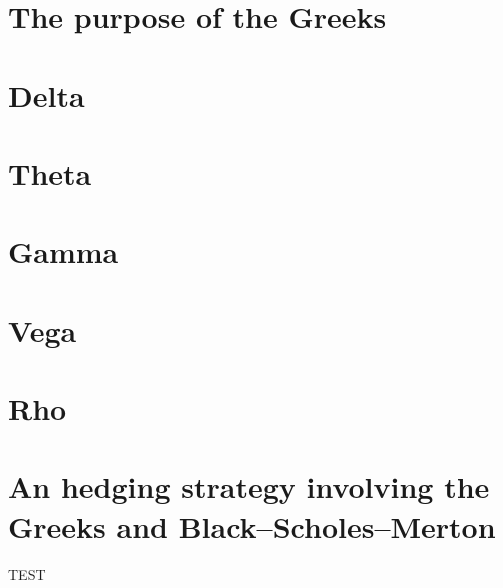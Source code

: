\documentclass[12pt]{report}
\newcommand{\BSM}{Black--Scholes--Merton }
\begin{document}
\section{The purpose of the Greeks}
\label{sec:The purpose of the Greeks}


\section{Delta}
\label{sec:Delta}


\section{Theta}
\label{sec:Theta}


\section{Gamma}
\label{sec:Gamma}


\section{Vega}
\label{sec:Vega}


\section{Rho}
\label{sec:Rho}


\section{An hedging strategy involving the Greeks and \BSM}
\label{sec:An hedging strategy involving the Greeks and \BSM}

TEST
\end{document}
